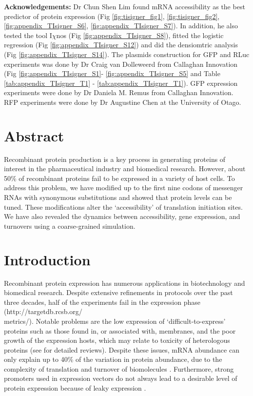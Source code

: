 \textbf{Acknowledgements:} Dr Chun Shen Lim found mRNA accessibility as the best predictor of protein expression (Fig \ref{fig:tisigner_fig1}, \ref{fig:tisigner_fig2}, \ref{fig:appendix_TIsigner_S6}, \ref{fig:appendix_TIsigner_S7}). In addition, he also tested the tool I$\chi$nos (Fig \ref{fig:appendix_TIsigner_S8}), fitted the logistic regression  (Fig \ref{fig:appendix_TIsigner_S12}) and did the densiomtric analysis (Fig \ref{fig:appendix_TIsigner_S14}). The plasmids construction for GFP and RLuc experiments was done by Dr Craig van Dolleweerd from Callaghan Innovation (Fig \ref{fig:appendix_TIsigner_S1}- \ref{fig:appendix_TIsigner_S5} and Table \ref{tab:appendix_TIsigner_T1} - \ref{tab:appendix_TIsigner_T1}). GFP expression experiments were done by Dr Daniela M. Remus from Callaghan Innovation. RFP experiments were done by Dr Augustine Chen at the University of Otago.
\\


\section{Abstract}
Recombinant protein production is a key process in generating proteins of interest in the pharmaceutical industry and biomedical research. However, about 50\% of recombinant proteins fail to be expressed in a variety of host cells. To address this problem, we have modified up to the first nine codons of messenger RNAs with synonymous substitutions and showed that protein levels can be tuned. These modifications alter the ‘accessibility’ of translation initiation sites. We have also revealed the dynamics between accessibility, gene expression, and turnovers using a coarse-grained simulation.

\section{Introduction}
Recombinant protein expression has numerous applications in biotechnology and biomedical research. Despite extensive refinements in protocols over the past three decades, half of the experiments fail in the expression phase (http://targetdb.rcsb.org/\\metrics/). Notable problems are the low expression of ‘difficult-to-express’ proteins such as those found in, or associated with, membranes, and the poor growth of the expression hosts, which may relate to toxicity of heterologous proteins \cite{Kimelman2012-cu} (see \cite{Berlec2013-mb,Rosano2014-oq} for detailed reviews). Despite these issues, mRNA abundance can only explain up to 40\% of the variation in protein abundance, due to the complexity of translation and turnover of biomolecules \cite{Abreu2009-zf,Hanson2018-ge,Lim2018-rq,Stevens2013-hu,Schwanhausser2011-po,Bernstein2002-gg,Taniguchi2010-uq}. Furthermore, strong promoters used in expression vectors do not always lead to a desirable level of protein expression because of leaky expression \cite{Rosano2014-oq}.

